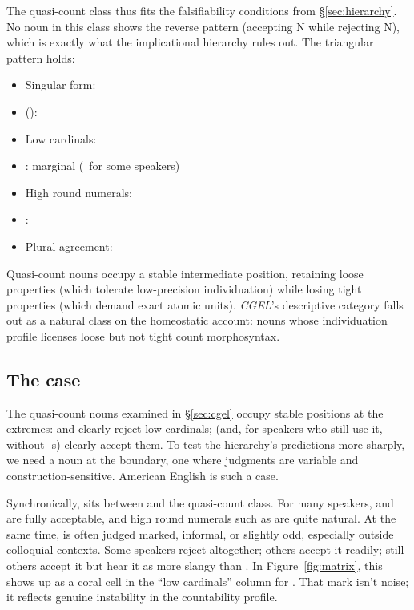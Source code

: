 \documentclass[12pt,a4paper]{article}
\newcommand{\cmark}{\ding{51}} %
\newcommand{\xmark}{\ding{55}} %
\begin{document}
The quasi-count class thus fits the falsifiability conditions from \S\ref{sec:hierarchy}. No noun in this class shows the reverse pattern (accepting  N while rejecting  N), which is exactly what the implicational hierarchy rules out. The triangular pattern holds:

\begin{itemize}
\item Singular form: \xmark
\item {}(): \xmark
\item Low cardinals: \xmark
\item {}: marginal (\cmark\ for some speakers)
\item High round numerals: \cmark
\item {}: \cmark
\item Plural agreement: \cmark
\end{itemize}

Quasi-count nouns occupy a stable intermediate position, retaining loose properties (which tolerate low-precision individuation) while losing tight properties (which demand exact atomic units). \textit{CGEL}'s descriptive category falls out as a natural class on the homeostatic account: nouns whose individuation profile licenses loose but not tight count morphosyntax.

\subsection{The  case}\label{sec:folks}

The quasi-count nouns examined in \S\ref{sec:cgel} occupy stable positions at the extremes:  and  clearly reject low cardinals;  (and, for speakers who still use it,  without -s) clearly accept them. To test the hierarchy's predictions more sharply, we need a noun at the boundary, one where judgments are variable and construction-sensitive. American English  is such a case.

Synchronically,  sits between  and the quasi-count class. For many speakers,  and  are fully acceptable, and high round numerals such as  are quite natural. At the same time,  is often judged marked, informal, or slightly odd, especially outside colloquial contexts. Some speakers reject  altogether; others accept it readily; still others accept it but hear it as more slangy than . In Figure~\ref{fig:matrix}, this shows up as a coral cell in the \enquote{low cardinals} column for . That mark isn't noise; it reflects genuine instability in the countability profile.
\end{document}
